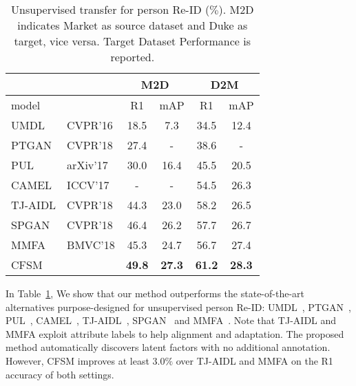 \documentclass[letterpaper]{article} \usepackage{aaai19}  \usepackage{times}  \usepackage{helvet}  \usepackage{courier}  \usepackage{url}  \usepackage{graphicx}
\begin{document}
\begin{table}[t]
\centering
\small
\begin{tabular}{ll|cc|cc}
\hline
\multicolumn{1}{c}{} & \multicolumn{1}{c|}{} & \multicolumn{2}{c|}{M2D} & \multicolumn{2}{c}{D2M} \\ \hline
model      &           & R1          & mAP         & R1           & mAP         \\ \hline
UMDL       &  CVPR'16     &     18.5    &    7.3     &     34.5     &    12.4     \\
PTGAN      &  CVPR'18     &     27.4        &     -        &  38.6            &    -         \\
PUL        &  arXiv'17    &     30.0    &    16.4     &     45.5     &   20.5      \\
CAMEL      &  ICCV'17     &     -    &      -   &     54.5     &   26.3      \\
TJ-AIDL    &  CVPR'18         & 44.3        & 23.0        & 58.2         & 26.5        \\
SPGAN      &  CVPR'18         & 46.4        & 26.2        & 57.7         & 26.7        \\ 
MMFA       &  BMVC'18   &      45.3       &   24.7          &   56.7           &  27.4           \\ \hline
CFSM       &            & {\bf 49.8}        & {\bf  27.3}        & {\bf 61.2}         & {\bf 28.3}        \\ \hline
\end{tabular}
\caption{Unsupervised transfer for person Re-ID ($\%$). M2D indicates Market as  source dataset and Duke as target, vice versa. Target Dataset Performance is reported.}
\label{tab:Unsup_ReID}
\end{table}

In Table~\ref{tab:Unsup_ReID}, We show that our method outperforms the state-of-the-art alternatives purpose-designed for unsupervised person Re-ID: UMDL~\cite{peng2016unsupervised}, PTGAN~\cite{wei2017_trans_GAN}, PUL~\cite{fan2017unsupervised_reid}, CAMEL~\cite{yu2017cross}, TJ-AIDL~\cite{attr_label_transfer_2018wang}, SPGAN~\cite{deng2017image-image} and MMFA~\cite{lin2018multi}.
Note that TJ-AIDL and MMFA exploit attribute labels to help alignment and adaptation. The proposed method automatically discovers latent factors with no additional annotation. However, CFSM improves at least $3.0\%$ over TJ-AIDL and MMFA on the R1 accuracy of both settings.
\end{document}
